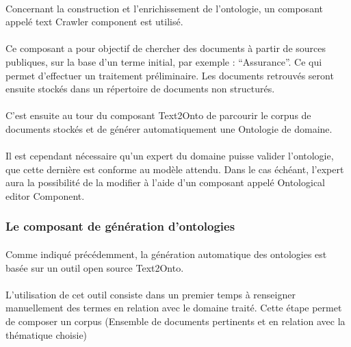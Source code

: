 \documentclass[12pt, a4paper, oneside]{book}
\begin{document}
\paragraph{}
Concernant la construction et l'enrichissement de l'ontologie, un composant appelé text Crawler component est utilisé.
\paragraph{}
Ce composant a pour objectif de chercher des documents à partir de sources publiques, sur la base d'un terme initial, par exemple : “Assurance”. Ce qui permet d'effectuer un traitement préliminaire.
Les documents retrouvés seront ensuite stockés dans un répertoire de documents non structurés.
\paragraph{}
C'est ensuite au tour du composant Text2Onto de parcourir le corpus de documents stockés et de générer automatiquement une Ontologie de domaine.
\paragraph{}
Il est cependant nécessaire qu'un expert du domaine puisse valider l'ontologie, que cette dernière est conforme au modèle attendu. Dans le cas échéant, l'expert aura la possibilité de la modifier à l'aide d'un composant appelé Ontological editor Component.
                                           
\subsubsection{Le composant de génération d'ontologies}
\paragraph{}
Comme indiqué précédemment, la génération automatique des ontologies est basée sur un outil open source Text2Onto.
\paragraph{}
L'utilisation de cet outil consiste dans un premier temps à renseigner manuellement des termes en relation avec le domaine traité. 
Cette étape permet de composer un corpus (Ensemble de documents pertinents et en relation avec la thématique choisie)
\end{document}

